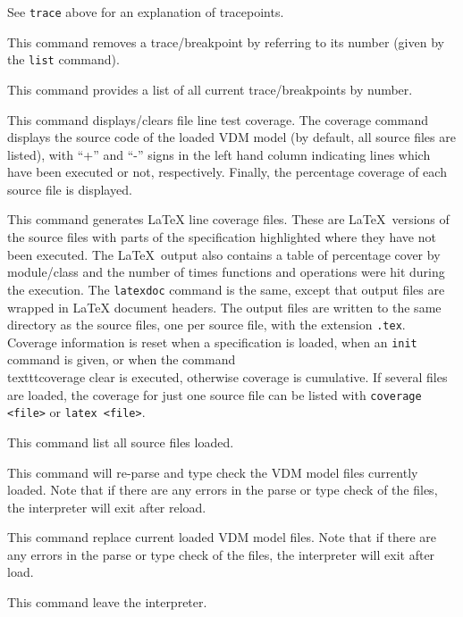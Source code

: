 \documentclass{overturerepsec}
\begin{document}
\begin{description}
  See \texttt{trace} above for an explanation of tracepoints.
\item[\texttt{remove <breakpoint\#>}:] This command removes a
  trace/breakpoint by referring to its number (given by the
  \texttt{list} command).  
\item[\texttt{list}:] This command provides a list of all current
  trace/breakpoints by number.  
\item[\texttt{coverage [<file>|clear]}:] This command displays/clears
  file line test coverage. The coverage command displays the source
  code of the loaded VDM model (by default, all source files are
  listed), with ``+'' and ``-'' signs in the left hand column indicating
  lines which have been executed or not, respectively. Finally, the
  percentage coverage of each source file is
  displayed.  
\item[\texttt{latex|latexdoc [<files>]}:] This command generates LaTeX
  line coverage files. These are \LaTeX\ versions of the source files
  with parts of the
  specification highlighted where they have not been executed. The
  \LaTeX\ output also contains a table of percentage cover by
  module/class and the number of times functions and operations were
  hit during the execution. The \texttt{latexdoc} command is the same,
  except that output files are wrapped in LaTeX document headers. The
  output files are written to the same directory as the source files, one
  per source file, with the extension \texttt{.tex}. Coverage
  information is reset when a specification is loaded, when an \texttt{init}
  command is given, or when the
  command \\texttt{coverage clear} is executed, otherwise coverage is
  cumulative. If several files are loaded, the coverage for just one
  source file can be listed with \texttt{coverage <file>} or
  \texttt{latex <file>}.  
\item[\texttt{files}:] This command list all source files loaded.
\item[\texttt{reload}:] This command will re-parse and type check the
  VDM model files currently loaded. Note that if there are any errors
  in the parse or type check of the files, the interpreter will exit
  after reload. 
\item[\texttt{load <files>}:] This command replace current loaded VDM
  model files. Note that if there are any errors in the parse or type
  check of the files, the interpreter will exit after
  load.  
\item[\texttt{[q]uit}:] This command leave the
  interpreter.  
\end{description}
\end{document}
